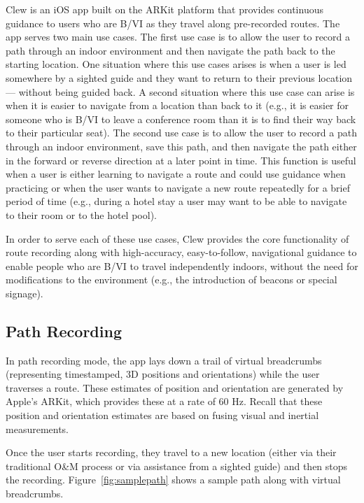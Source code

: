 \documentclass[chi_draft]{sigchi}
\newcommand{\BVI}{B/VI\xspace}
\newcommand{\OM}{O\&M\xspace}
\begin{document}
Clew is an iOS app built on the ARKit platform that provides continuous guidance to users who are \BVI as they travel along pre-recorded routes.  The app serves two main use cases.  The first use case is to allow the user to record a path through an indoor environment and then navigate the path back to the starting location.  One situation where this use cases arises is when a user is led somewhere by a sighted guide and they want to return to their previous location --- without being guided back.  A second situation where this use case can arise is when it is easier to navigate from a location than back to it (e.g., it is easier for someone who is \BVI to leave a conference room than it is to find their way back to their particular seat).  The second use case is to allow the user to record a path through an indoor environment, save this path, and then navigate the path either in the forward or reverse direction at a later point in time.  This function is useful when a user is either learning to navigate a route and could use guidance when practicing or when the user wants to navigate a new route repeatedly for a brief period of time (e.g., during a hotel stay a user may want to be able to navigate to their room or to the hotel pool).

In order to serve each of these use cases, Clew provides the core functionality of route recording along with high-accuracy, easy-to-follow, navigational guidance to enable people who are \BVI to travel independently indoors, without the need for modifications to the environment (e.g., the introduction of beacons or special signage).

\subsection{Path Recording}

In path recording mode, the app lays down a trail of virtual breadcrumbs (representing timestamped, 3D positions and orientations) while the user traverses a route.  These estimates of position and orientation are generated by Apple's ARKit, which provides these at a rate of 60 Hz.  Recall that these position and orientation estimates are based on fusing visual and inertial measurements. %

Once the user starts recording, they travel to a new location (either via their traditional \OM process or via assistance from a sighted guide) and then stops the recording.  Figure~\ref{fig:samplepath} shows a sample path along with virtual breadcrumbs.
%
\end{document}

